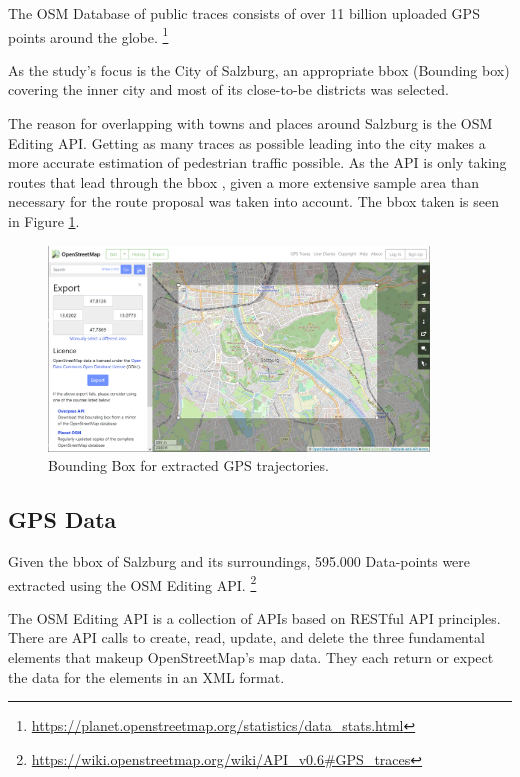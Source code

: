 The OSM Database of public traces consists of over 11 billion uploaded GPS points around the globe. \footnote{\url{https://planet.openstreetmap.org/statistics/data_stats.html}}

As the study's focus is the City of Salzburg, an appropriate bbox (Bounding box) covering the inner city and most of its close-to-be districts was selected. 

The reason for overlapping with towns and places around Salzburg is the OSM Editing API. Getting as many traces as possible leading into the city makes a more accurate estimation of pedestrian traffic possible. As the API is only taking routes that lead through the bbox , given a more extensive sample area than necessary for the route proposal was taken into account. The bbox taken is seen in Figure \ref{figure:BoundingBox}.

\begin{figure}[t]
  \centering
  \includegraphics[width=0.9\textwidth]{images/BoundingBoxOSM.png}
  \caption{
  Bounding Box for extracted GPS trajectories.
  }
  \label{figure:BoundingBox}
\end{figure}


\subsection{GPS Data}

Given the bbox of Salzburg and its surroundings, 595.000 Data-points were extracted using the OSM Editing API. \footnote{\url{https://wiki.openstreetmap.org/wiki/API_v0.6#GPS_traces}}

The OSM Editing API is a collection of APIs based on RESTful API principles. There are API calls to create, read, update, and delete the three fundamental elements that makeup OpenStreetMap's map data. They each return or expect the data for the elements in an XML format.
\autocite[]{wiki:xxx}

